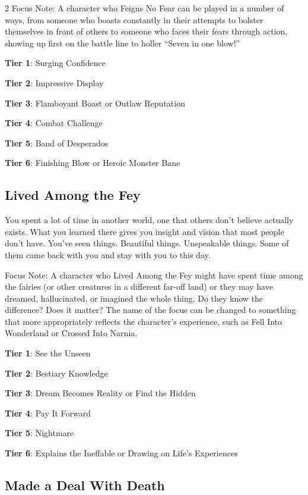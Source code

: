 \begin{multicols}{2}
Focus Note: A character who Feigns No Fear can be played in a number of ways, from someone who boasts constantly in their attempts to bolster themselves in front of others to someone who faces their fears through action, showing up first on the battle line to holler “Seven in one blow!”

\textbf{Tier 1}: Surging Confidence

\textbf{Tier 2}: Impressive Display

\textbf{Tier 3}: Flamboyant Boast or Outlaw Reputation

\textbf{Tier 4}: Combat Challenge

\textbf{Tier 5}: Band of Desperados

\textbf{Tier 6}: Finishing Blow or Heroic Monster Bane

\subsection{Lived Among the Fey}

You spent a lot of time in another world, one that others don’t believe actually exists. What you learned there gives you insight and vision that most people don’t have. You’ve seen things. Beautiful things. Unspeakable things. Some of them came back with you and stay with you to this day.

Focus Note: A character who Lived Among the Fey might have spent time among the fairies (or other creatures in a different far-off land) or they may have dreamed, hallucinated, or imagined the whole thing. Do they know the difference? Does it matter? The name of the focus can be changed to something that more appropriately reflects the character’s experience, such as Fell Into Wonderland or Crossed Into Narnia.

\textbf{Tier 1}: See the Unseen

\textbf{Tier 2}: Bestiary Knowledge

\textbf{Tier 3}: Dream Becomes Reality or Find the Hidden

\textbf{Tier 4}: Pay It Forward

\textbf{Tier 5}: Nightmare

\textbf{Tier 6}: Explains the Ineffable or Drawing on Life’s Experiences

\subsection{Made a Deal With Death}


\end{multicols}
